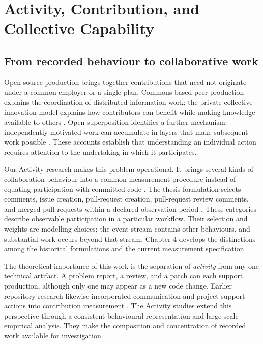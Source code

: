 \section{Activity, Contribution, and Collective Capability}
\label{sec:production}

\subsection{From recorded behaviour to collaborative work}
Open source production brings together contributions that need not originate under a common employer or a single plan. Commons-based peer production explains the coordination of distributed information work; the private-collective innovation model explains how contributors can benefit while making knowledge available to others \citep{benkler2002,vonhippel2003}. Open superposition identifies a further mechanism: independently motivated work can accumulate in layers that make subsequent work possible \citep{howison2014}. These accounts establish that understanding an individual action requires attention to the undertaking in which it participates.

Our Activity research makes this problem operational. It brings several kinds of collaboration behaviour into a common measurement procedure instead of equating participation with committed code \citep{xia2022}. The thesis formulation selects comments, issue creation, pull-request creation, pull-request review comments, and merged pull requests within a declared observation period \citep[Section 5.2.1]{xia2024thesis}. These categories describe observable participation in a particular workflow. Their selection and weights are modelling choices; the event stream contains other behaviours, and substantial work occurs beyond that stream. Chapter 4 develops the distinctions among the historical formulations and the current measurement specification.

The theoretical importance of this work is the separation of \emph{activity} from any one technical artifact. A problem report, a review, and a patch can each support production, although only one may appear as a new code change. Earlier repository research likewise incorporated communication and project-support actions into contribution measurement \citep{gousios2008}. The Activity studies extend this perspective through a consistent behavioural representation and large-scale empirical analysis. They make the composition and concentration of recorded work available for investigation.

